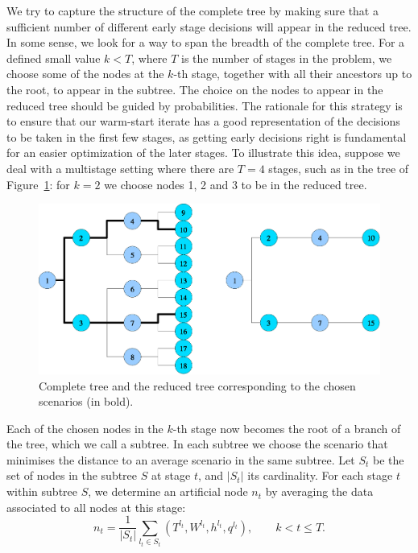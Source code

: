 We try to capture the structure of the complete tree by making sure 
that a sufficient number of different early stage decisions will 
appear in the reduced tree. In some sense, we look for a way to span 
the breadth of the complete tree. For a defined small value $k < T$, where 
$T$ is the number of stages in the problem, we choose some of the 
nodes at the $k$-th stage, together with all their ancestors up to the 
root, to appear in the subtree. The choice on the nodes to appear in
the reduced tree should be guided by probabilities.
The rationale for this strategy is to ensure that our warm-start 
iterate has a good representation of the decisions to be taken 
in the first few stages, as getting early decisions right is fundamental
for an easier optimization of the later stages.
%
To illustrate this idea, suppose we deal with a multistage setting where 
there are $T=4$ stages, such as in the tree of Figure~\ref{fig:Tree}: 
for $k=2$ we choose nodes 1, 2 and 3 to be in the reduced tree.
\begin{figure}[ht]
  \begin{center}
    \includegraphics[scale=.6]{figures/redtree.eps}
    \caption{Complete tree and the reduced tree corresponding to the
             chosen scenarios (in bold).}
    \label{fig:Tree}
  \end{center}
  \vspace{-3ex}
\end{figure}

Each of the chosen nodes in the $k$-th stage now becomes the root of a 
branch of the tree, which we call a subtree. In each subtree we choose 
the scenario that minimises the distance to an average scenario in the 
same subtree.
%
Let $S_t$ be the set of nodes in the subtree $S$ at stage $t$, and 
$|S_t|$ its cardinality. For each stage $t$ within subtree $S$, 
we determine an artificial node $n_t$ by averaging the data 
associated to all nodes at this stage:
\[
n_t = \frac{1}{|S_t|} \sum_{l_t \in S_t} (T^{l_t}, W^{l_t}, h^{l_t}, q^{l_t}),
  \qquad k < t \le T.
\]

